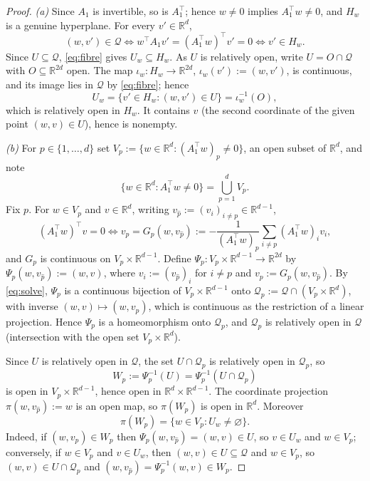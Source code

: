 \documentclass[11pt]{article}
\theoremstyle{definition}
\theoremstyle{remark}
\theoremstyle{plain}
\newcommand{\R}{\mathbb{R}}
\newcommand{\cQ}{\mathcal{Q}}
\begin{document}
\begin{proof}
\emph{(a)}  Since $A_1$ is invertible, so is $A_1^\top$; hence $w\neq0$ implies
$A_1^\top w\neq0$, and $H_w$ is a genuine hyperplane.  For every $v'\in\R^d$,
\begin{equation}\label{eq:fibre}
(w,v')\in\cQ\iff w^\top A_1v'=(A_1^\top w)^\top v'=0\iff v'\in H_w .
\end{equation}
Since $U\subseteq\cQ$, \eqref{eq:fibre} gives $U_w\subseteq H_w$.  As $U$ is relatively
open, write $U=O\cap\cQ$ with $O\subseteq\R^{2d}$ open.  The map $\iota_w:H_w\to\R^{2d}$,
$\iota_w(v'):=(w,v')$, is continuous, and its image lies in $\cQ$ by \eqref{eq:fibre};
hence
\[
U_w=\{v'\in H_w:(w,v')\in U\}=\iota_w^{-1}(O),
\]
which is relatively open in $H_w$.  It contains $v$ (the second coordinate of the given
point $(w,v)\in U$), hence is nonempty.

\emph{(b)}  For $p\in\{1,\dots,d\}$ set $V_p:=\{w\in\R^d:(A_1^\top w)_p\neq0\}$, an open
subset of $\R^d$, and note
\begin{equation}\label{eq:cover}
\{w\in\R^d:A_1^\top w\neq0\}=\bigcup_{p=1}^d V_p .
\end{equation}
Fix $p$.  For $w\in V_p$ and $v\in\R^d$, writing
$v_{\widehat p}:=(v_i)_{i\neq p}\in\R^{d-1}$,
\begin{equation}\label{eq:solve}
(A_1^\top w)^\top v=0\iff
v_p=G_p(w,v_{\widehat p}):=-\frac{1}{(A_1^\top w)_p}\sum_{i\neq p}(A_1^\top w)_i v_i ,
\end{equation}
and $G_p$ is continuous on $V_p\times\R^{d-1}$.  Define
$\Psi_p:V_p\times\R^{d-1}\to\R^{2d}$ by $\Psi_p(w,v_{\widehat p}):=(w,v)$, where
$v_i:=(v_{\widehat p})_i$ for $i\neq p$ and $v_p:=G_p(w,v_{\widehat p})$.  By
\eqref{eq:solve}, $\Psi_p$ is a continuous bijection of $V_p\times\R^{d-1}$ onto
$\cQ_p:=\cQ\cap(V_p\times\R^d)$, with inverse $(w,v)\mapsto(w,v_{\widehat p})$, which is
continuous as the restriction of a linear projection.  Hence $\Psi_p$ is a homeomorphism
onto $\cQ_p$, and $\cQ_p$ is relatively open in $\cQ$ (intersection with the open set
$V_p\times\R^d$).

Since $U$ is relatively open in $\cQ$, the set $U\cap\cQ_p$ is relatively open in
$\cQ_p$, so
\[
W_p:=\Psi_p^{-1}(U)=\Psi_p^{-1}(U\cap\cQ_p)
\]
is open in $V_p\times\R^{d-1}$, hence open in $\R^d\times\R^{d-1}$.  The coordinate
projection $\pi(w,v_{\widehat p}):=w$ is an open map, so $\pi(W_p)$ is open in $\R^d$.
Moreover
\begin{equation}\label{eq:proj}
\pi(W_p)=\{w\in V_p:U_w\neq\varnothing\}.
\end{equation}
Indeed, if $(w,v_{\widehat p})\in W_p$ then $\Psi_p(w,v_{\widehat p})=(w,v)\in U$, so
$v\in U_w$ and $w\in V_p$; conversely, if $w\in V_p$ and $v\in U_w$, then
$(w,v)\in U\subseteq\cQ$ and $w\in V_p$, so $(w,v)\in U\cap\cQ_p$ and
$(w,v_{\widehat p})=\Psi_p^{-1}(w,v)\in W_p$.


\end{proof}
\end{document}
